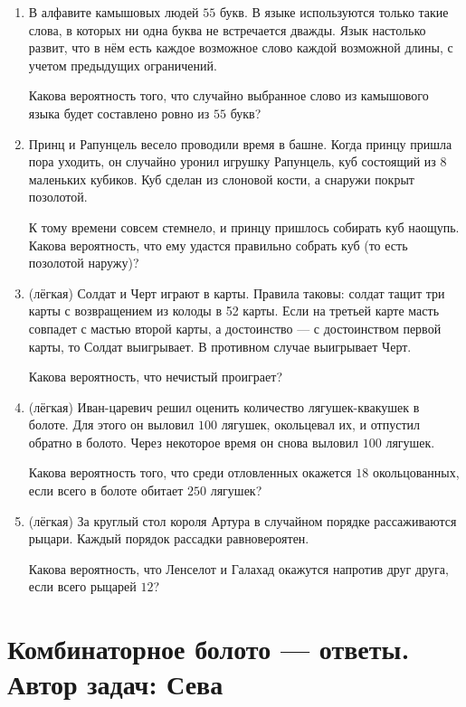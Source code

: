 \documentclass[a4paper,12pt]{article}
\begin{document}
\begin{enumerate} %
\item %
В алфавите камышовых людей $55$ букв. В языке используются только такие слова, в которых ни одна буква не встречается дважды. Язык настолько развит, что в нём есть каждое возможное слово каждой возможной длины, с учетом предыдущих ограничений.

Какова вероятность того, что случайно выбранное слово из камышового языка будет составлено ровно из $55$ букв?
\item
Принц и Рапунцель весело проводили время в башне. Когда принцу пришла пора уходить, он случайно уронил игрушку Рапунцель, куб состоящий из 8 маленьких кубиков. Куб сделан из слоновой кости, а снаружи покрыт позолотой.

К тому времени совсем стемнело, и принцу пришлось собирать куб наощупь. Какова вероятность, что ему удастся правильно собрать куб (то есть позолотой наружу)?
\item (лёгкая)
Солдат и Черт играют в карты. Правила таковы: солдат тащит три карты с возвращением из колоды в 52 карты. Если на третьей карте масть совпадет с мастью второй карты, а достоинство — с достоинством первой карты, то Солдат выигрывает. В противном случае выигрывает Черт.

Какова вероятность, что нечистый проиграет?
\item (лёгкая)
Иван-царевич решил оценить количество лягушек-квакушек в болоте. Для этого он выловил $100$ лягушек, окольцевал их, и отпустил обратно в болото. Через некоторое время он снова выловил $100$ лягушек.

Какова вероятность того, что среди отловленных окажется $18$ окольцованных, если всего в болоте обитает $250$ лягушек?
\item (лёгкая)
За круглый стол короля Артура в случайном порядке рассаживаются рыцари. Каждый порядок рассадки равновероятен.

Какова вероятность, что Ленселот и Галахад окажутся напротив друг друга, если всего рыцарей $12$?
\end{enumerate}
\newpage
\section{Комбинаторное болото — ответы. Автор задач: Сева}
\end{document}
